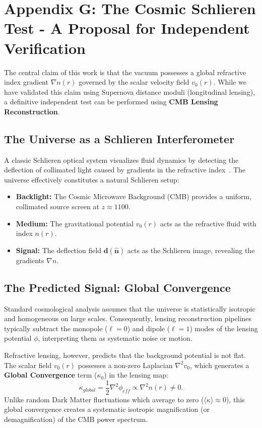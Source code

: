 \documentclass[11pt]{article}
\begin{document}
\section{Appendix G: The Cosmic Schlieren Test - A Proposal for Independent Verification}
\label{app:cosmic_schlieren}

The central claim of this work is that the vacuum possesses a global refractive index gradient $\nabla n(r)$ governed by the scalar velocity field $v_0(r)$. While we have validated this claim using Supernova distance moduli (longitudinal lensing), a definitive independent test can be performed using \textbf{CMB Lensing Reconstruction}.

\subsection{The Universe as a Schlieren Interferometer}
A classic Schlieren optical system visualizes fluid dynamics by detecting the deflection of collimated light caused by gradients in the refractive index~\cite{Toepler1864}. The universe effectively constitutes a natural Schlieren setup:
\begin{itemize}
    \item \textbf{Backlight:} The Cosmic Microwave Background (CMB) provides a uniform, collimated source screen at $z \approx 1100$.
    \item \textbf{Medium:} The gravitational potential $v_0(r)$ acts as the refractive fluid with index $n(r)$.
    \item \textbf{Signal:} The deflection field $\mathbf{d}(\hat{\mathbf{n}})$ acts as the Schlieren image, revealing the gradients $\nabla n$.
\end{itemize}

\subsection{The Predicted Signal: Global Convergence}
Standard cosmological analysis assumes that the universe is statistically isotropic and homogeneous on large scales. Consequently, lensing reconstruction pipelines typically subtract the monopole ($\ell=0$) and dipole ($\ell=1$) modes of the lensing potential $\phi$, interpreting them as systematic noise or motion.

Refractive lensing, however, predicts that the background potential is not flat. The scalar field $v_0(r)$ possesses a non-zero Laplacian $\nabla^2 v_0$, which generates a \textbf{Global Convergence} term ($\kappa_0$) in the lensing map:
\begin{equation}
    \kappa_{global} = \frac{1}{2} \nabla^2 \phi_{eff} \propto \nabla^2 n(r) \neq 0.
\end{equation}
Unlike random Dark Matter fluctuations which average to zero ($\langle \kappa \rangle \approx 0$), this global convergence creates a systematic isotropic magnification (or demagnification) of the CMB power spectrum.
\end{document}

